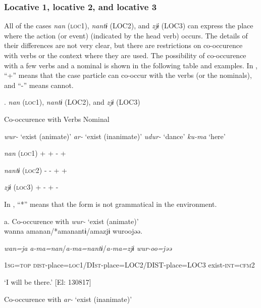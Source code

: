 \subsubsection{Locative 1, locative 2, and locative 3}

All of the cases \textit{nan} (\textsc{loc}1), \textit{nantɨ} (LOC2), and \textit{zjɨ} (LOC3) can express the place where the action (or event) (indicated by the head verb) occurs. The details of their differences are not very clear, but there are restrictions on co-occurence with verbs or the context where they are used. The possibility of co-occurence with a few verbs and a nominal is shown in the following table and examples. In , “+” means that the case particle can co-occur with the verbs (or the nominals), and “-” means cannot.

\begin{styleBeschriftung}
\textmd{.} \textmd{\textit{nan}}\textmd{ (\textsc{loc}1),} \textmd{\textit{nantɨ}}\textmd{ (LOC2), and} \textmd{\textit{zjɨ}}\textmd{ (LOC3)}
\end{styleBeschriftung}

Co-occurence with  Verbs        Nominal

    \textit{wur-} ‘exist (animate)’  \textit{ar-} ‘exist (inanimate)’  \textit{udur-} ‘dance’    \textit{ku-ma} ‘here’

\textit{nan}  (\textsc{loc}1)  +  +  {}-    +

\textit{nantɨ}  (\textsc{loc}2)  {}-  {}-  +    +

\textit{zjɨ}  (\textsc{loc}3)  +  {}-  +    {}-

In , “*” means that the form is not grammatical in the environment.

\ea\label{ex:6-83}
 a. Co-occurence with \textit{wur-} ‘exist (animate)’\\

{\TM}
\gll wanna  amanan/*amanantɨ/amazjɨ  wuroojəə.

    \textit{wan=ja}  \textit{a-ma=nan}/\textit{a-ma=nantɨ}/\textit{a-ma=zjɨ}  \textit{wur-oo=jəə}

    1\textsc{sg}=\textsc{top}  \textsc{dist}-place=\textsc{loc}1/DI\textsc{st}-place=LOC2/DIST-place=LOC3  exist-\textsc{int}=\textsc{cfm}2

\glt    ‘I will be there.’ [El: 130817]

\ex Co-occurence with \textit{ar-} ‘exist (inanimate)’\\

